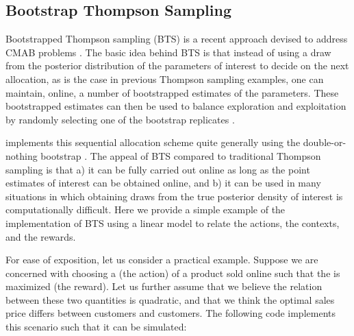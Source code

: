 \documentclass[nojss]{jss}
\begin{document}
\subsection{Bootstrap Thompson Sampling}

Bootstrapped Thompson sampling (BTS) is a recent approach devised to address CMAB problems \citep[see,  e.g.,][]{Kaptein,Osband2015}. The basic idea behind BTS is that instead of using a draw from the posterior distribution of the parameters of interest to decide on the next allocation, as is the case in previous Thompson sampling examples, one can maintain, online, a number of bootstrapped estimates of the parameters. These bootstrapped estimates can then be used to balance exploration and exploitation by randomly selecting one of the bootstrap replicates \citep[see][for details]{Kaptein}.

 implements this sequential allocation scheme quite generally using the double-or-nothing bootstrap \citep{Owen2012}. The appeal of BTS compared to traditional Thompson sampling is that a) it can be fully carried out online as long as the point estimates of interest can be obtained online, and b) it can be used in many situations in which obtaining draws from the true posterior density of interest is computationally difficult. Here we provide a simple example of the implementation of BTS using a linear model to relate the actions, the contexts, and the rewards.

For ease of exposition, let us consider a practical example. Suppose we are concerned with choosing a  (the action) of a product sold online such that the  is maximized (the reward). Let us further assume that we believe the relation between these two quantities is quadratic, and that we think the optimal sales price differs between  customers and  customers. The following code implements this scenario such that it can be simulated:
\end{document}
